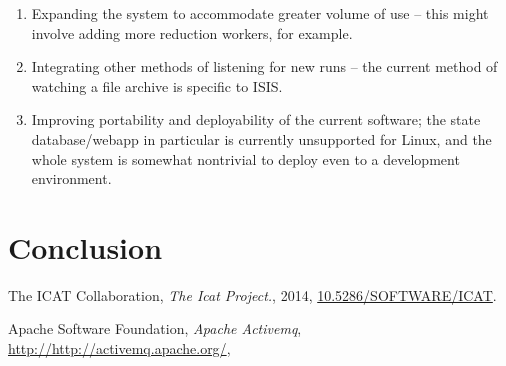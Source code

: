 \documentclass[twocolumn]{article}
\begin{document}
\begin{enumerate}
\item
  Expanding the system to accommodate greater volume of use -- this
  might involve adding more reduction workers, for example.
\item
  Integrating other methods of listening for new runs -- the current
  method of watching a file archive is specific to ISIS.
\item
  Improving portability and deployability of the current software; the
  state database/webapp in particular is currently unsupported for
  Linux, and the whole system is somewhat nontrivial to deploy even to a
  development environment.
\end{enumerate}

\section{Conclusion}\label{conclusion}


\begin{thebibliography}{9}
    The ICAT Collaboration,
    \emph{The Icat Project.},
    2014,
    \href{https://doi.org/10.5286/SOFTWARE/ICAT}{10.5286/SOFTWARE/ICAT}.
    
    Apache Software Foundation,
    \emph{Apache Activemq},
    \url{http://http://activemq.apache.org/},
\end{thebibliography}
\end{document}
